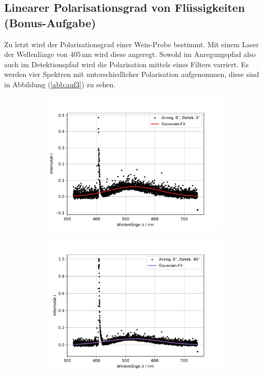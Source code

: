\subsection{Linearer Polarisationsgrad von Flüssigkeiten (Bonus-Aufgabe)}
Zu letzt wird der Polarisationsgrad einer Wein-Probe bestimmt.
Mit einem Laser der Wellenl\"{a}nge von $405 \, $nm wird diese angeregt.
Sowohl im Anregungspfad also auch im Detektionspfad wird die Polarisation mittels eines Filters varriert.
Es werden vier Spektren mit unterschiedlicher Polarisation aufgenommen, diese sind in Abbildung (\ref{abb:auf3}) zu sehen.
\begin{figure}[hbtp]
\centering
	\begin{subfigure}[t]{0.45\textwidth}
	\includegraphics[width=\textwidth]{Plots/aufgabe3_P1.pdf}
	\end{subfigure}
	\begin{subfigure}[t]{0.45\textwidth}
	\includegraphics[width=\textwidth]{Plots/aufgabe3_P2.pdf}

\end{subfigure}
\end{figure}
